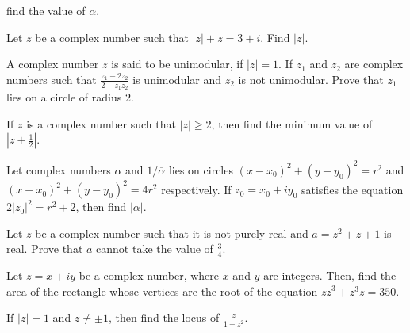   find the value of $\alpha$.
\item Let $z$ be a complex number such that $|z| + z = 3 + i$. Find $|z|$.
\item A complex number $z$ is said to be unimodular, if $|z| = 1$. If $z_1$ and $z_2$ are complex numbers
  such that $\frac{z_1 - 2z_2}{2 - z_1\overline{z_2}}$ is unimodular and $z_2$ is not unimodular. Prove that
  $z_1$ lies on a circle of radius $2$.
\item If $z$ is a complex number such that $|z|\geq 2$, then find the minimum value of $\left|z +
  \frac{1}{2}\right|$.
\item Let complex numbers $\alpha$ and $1/\overline{\alpha}$ lies on circles $(x - x_0)^2 + (y - y_0)^2 =
  r^2$ and $(x - x_0)^2 + (y - y_0)^2 = 4r^2$ respectively. If $z_0 = x_0 + iy_0$ satisfies the equation
  $2|z_0|^2 = r^2 + 2$, then find $|\alpha|$.
\item Let $z$ be a complex number such that it is not purely real and $a = z^2 + z + 1$ is real. Prove that
  $a$ cannot take the value of $\frac{3}{4}$.
\item Let $z = x + iy$ be a complex number, where $x$ and $y$ are integers. Then, find the area of the
  rectangle whose vertices are the root of the equation $z\overline{z}^3 + z^3\overline{z} = 350$.
\item If $|z| = 1$ and $z\neq \pm 1$, then find the locus of $\frac{z}{1 - z^2}$.
\stopitemize
